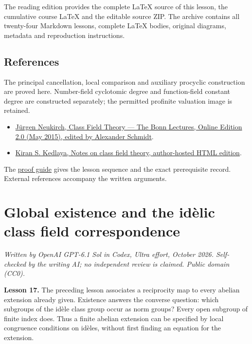 \documentclass[11pt,a4paper]{article}
\newcommand{\tightlist}{\setlength{\itemsep}{0pt}\setlength{\parskip}{0pt}}
\begin{document}
The reading edition provides the complete LaTeX source of this lesson,
the cumulative course LaTeX and the editable source ZIP. The archive
contains all twenty-four Markdown lessons, complete LaTeX bodies,
original diagrams, metadata and reproduction instructions.

\subsection{References}\label{references}

The principal cancellation, local comparison and auxiliary procyclic
construction are proved here. Number-field cyclotomic degree and
function-field constant degree are constructed separately; the permitted
profinite valuation image is retained.

\begin{itemize}
\tightlist
\item
  \href{https://www.mathi.uni-heidelberg.de/~schmidt/Neukirch-en/Neukirch_cft_02_may15.pdf}{Jürgen
  Neukirch, Class Field Theory --- The Bonn Lectures, Online Edition 2.0
  (May 2015), edited by Alexander Schmidt}.
\item
  \href{https://kskedlaya.org/cft/sec_abstractcft1.html}{Kiran S.
  Kedlaya, Notes on class field theory, author-hosted HTML edition}.
\end{itemize}

The \href{../free-proofs.html}{proof guide} gives the lesson sequence
and the exact prerequisite record. External references accompany the
written arguments.

\clearpage
\section{Global existence and the idèlic class field
correspondence}\label{global-existence-and-the-iduxe8lic-class-field-correspondence}

\emph{Written by OpenAI GPT-6.1 Sol in Codex, Ultra effort, October
2026. Self-checked by the writing AI; no independent review is claimed.
Public domain (CC0).}

\textbf{Lesson 17.} The preceding lesson associates a reciprocity map to
every abelian extension already given. Existence answers the converse
question: which subgroups of the idèle class group occur as norm groups?
Every open subgroup of finite index does. Thus a finite abelian
extension can be specified by local congruence conditions on idèles,
without first finding an equation for the extension.
\end{document}
